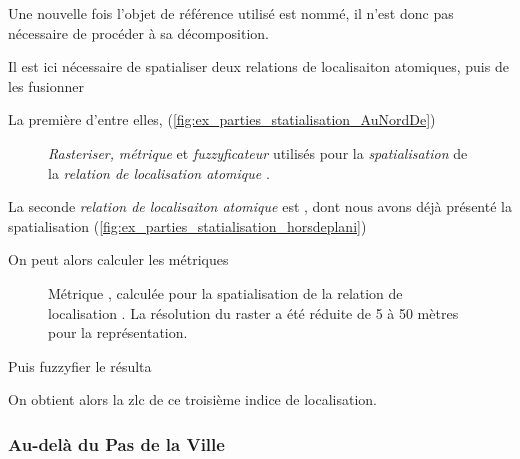 Une nouvelle fois l'objet de référence utilisé est nommé, il n'est
donc pas nécessaire de procéder à sa décomposition.

Il est ici nécessaire de spatialiser deux relations de localisaiton
atomiques, puis de les fusionner

La première d'entre elles, 
(\autoref{fig:ex_parties_statialisation_AuNordDe})

\begin{figure}
  \centering
  
  \caption{\emph{Rasteriser,} \emph{métrique} et \emph{fuzzyficateur}
    utilisés pour la \emph{spatialisation} de la \emph{relation de
      localisation atomique} \protect{}.}
  \label{fig:ex_parties_statialisation_AuNordDe}
\end{figure}

La seconde \emph{relation de localisaiton atomique} est
, dont nous avons déjà
présenté la spatialisation
(\autoref{fig:ex_parties_statialisation_horsdeplani})

On peut alors calculer les métriques

\begin{figure}
  \centering
  
  \caption{Métrique \protect{}, calculée
    pour la spatialisation de la relation de localisation
    \protect{}. La résolution du raster a
    été réduite de 5 à 50 mètres pour la représentation.}
  \label{fig:veyont_EcartNord}
\end{figure}

Puis fuzzyfier le résulta

%   

On obtient alors la \ac{zlc} de ce troisième indice de localisation.

%   




\subsubsection{Au-delà du Pas de la Ville}

